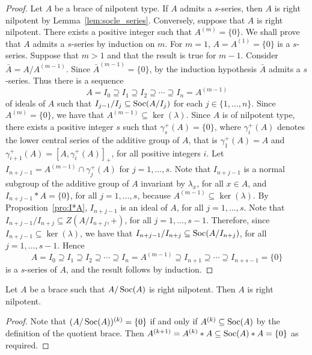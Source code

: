 \begin{proof}
    Let $A$ be a brace of nilpotent type. If $A$ admits a $s$-series, then $A$ is right nilpotent by
    Lemma~\ref{lem:socle_series}.
    Conversely, suppose that $A$ is right nilpotent.
    There exists a positive integer such that $A^{(m)}=\{0\}$.
    We shall prove that $A$ admits a $s$-series by induction on $m$. For $m=1$, $A=A^{(1)}=\{0\}$ is a $s$-series. Suppose
    that $m>1$ and that the result is true for $m-1$. Consider
    $\bar A=A/A^{(m-1)}$. Since $\bar A^{(m-1)}=\{0\}$, by the induction
    hypothesis $\bar A$ admits a $s$-series. Thus there is a
    sequence
    \[
        A=I_0\supseteq I_1\supseteq I_2\supseteq\cdots\supseteq I_n=A^{(m-1)}
    \]
    of ideals of $A$ such that $I_{j-1}/I_j\subseteq \operatorname{Soc}(A/I_j)$ for each
    $j\in\{1,\dots,n\}$. Since $A^{(m)}=\{0\}$, we have that $A^{(m-1)}\subseteq
    \ker(\lambda)$. Since $A$ is of nilpotent type, there exists a
    positive integer $s$ such that $\gamma^+_s(A)=\{0\}$, where
    $\gamma^+_i(A)$ denotes the lower central series of the additive
    group of $A$, that is $\gamma^+_1(A)=A$ and $\gamma^+_{i+1}(A)=[A,\gamma^+_i(A)]_+$, for all positive integers $i$.
    Let $I_{n+j-1}=A^{(m-1)}\cap \gamma^+_{j}(A)$ for $j=1,\dots ,s$.
    Note that $I_{n+j-1}$ is a normal subgroup of the additive group
    of $A$ invariant by $\lambda_x$, for all $x\in A$, and
    $I_{n+j-1}* A=\{0\}$, for all $j=1,\dots , s$, because $A^{(m-1)}\subseteq
    \ker(\lambda)$. By Proposition~\ref{pro:I*A}, $I_{n+j-1}$ is an ideal
    of $A$, for all $j=1,\dots , s$.
    Note that $I_{n+j-1}/I_{n+j}\subseteq Z(A/I_{n+j},+)$, for all $j=1,\dots ,s-1$. Therefore, since
    $I_{n+j-1}\subseteq\ker(\lambda)$, we have that $I_{n+j-1}/I_{n+j}\subseteq \operatorname{Soc}(A/I_{n+j})$, for all $j=1,\dots ,s-1$.
    Hence
    \[
        A=I_0\supseteq I_1\supseteq I_2\supseteq\cdots\supseteq
        I_n=A^{(m-1)}\supseteq I_{n+1}\supseteq\cdots\supseteq
        I_{n+s-1}=\{0\}
    \]
    is a $s$-series of $A$, and the result follows by induction.
\end{proof}

\begin{proposition}
    \label{pro:A/Soc}
    Let $A$ be a brace such that $A/\operatorname{Soc}(A)$ is right nilpotent. Then $A$
    is right nilpotent.
\end{proposition}

\begin{proof}
    Note that $(A/\operatorname{Soc}(A))^{(k)}=\{0\}$ if and only if $A^{(k)}\subseteq\operatorname{Soc}(A)$ by
    the definition of the quotient brace. Then $A^{(k+1)}=A^{(k)}*A\subseteq\operatorname{Soc}
    (A)*A=\{0\}$ as required.
\end{proof}

